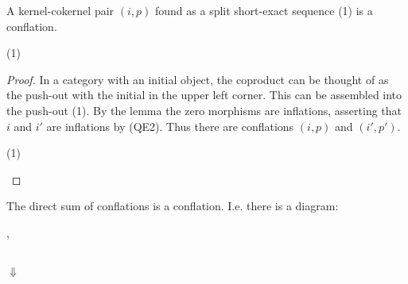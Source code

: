     \begin{corollary}
        A kernel-cokernel pair $(i,p)$ found as a split short-exact sequence (1) is a conflation. 
        
        \begin{center}
            (1)
        \end{center}
    \end{corollary}

    \begin{proof}
        In a category with an initial object, the coproduct can be thought of as the push-out with the initial in the upper left corner. This can be assembled into the push-out (1).
        By the lemma the zero morphisms are inflations, asserting that $i$ and $i'$ are inflations by (QE2). Thus there are conflations $(i,p)$ and $(i',p')$.

        \begin{center}
            (1)
        \end{center}
    \end{proof}

    \begin{corollary}
        The direct sum of conflations is a conflation. I.e. there is a diagram:
        \begin{center}
            , 
             \\
            $\Downarrow$ \\
        \end{center}
    \end{corollary}

